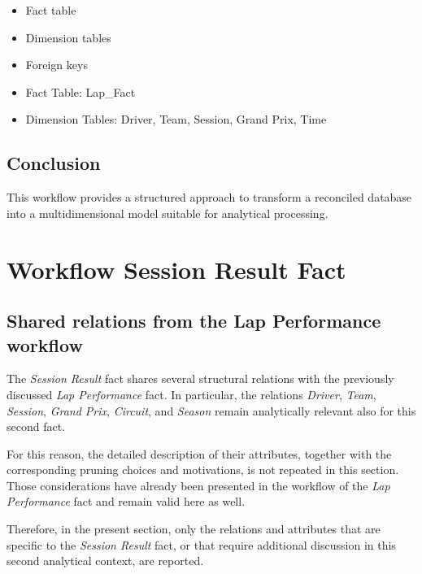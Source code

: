 \documentclass[a4paper,11pt]{article}
\begin{document}
	
	\begin{itemize}
		\item Fact table
		\item Dimension tables
		\item Foreign keys
	\end{itemize}
	
	
	\begin{itemize}
		\item Fact Table: Lap\_Fact
		\item Dimension Tables: Driver, Team, Session, Grand Prix, Time
	\end{itemize}
	
	\subsection{Conclusion}
	
	This workflow provides a structured approach to transform a reconciled database into a multidimensional model suitable for analytical processing.
	
	
	\section{Workflow Session Result Fact}
	
	\subsection{Shared relations from the Lap Performance workflow}
	
	The \textit{Session Result} fact shares several structural relations with the previously discussed \textit{Lap Performance} fact.
	In particular, the relations \textit{Driver}, \textit{Team}, \textit{Session}, \textit{Grand Prix}, \textit{Circuit}, and \textit{Season} remain analytically relevant also for this second fact.
	
	For this reason, the detailed description of their attributes, together with the corresponding pruning choices and motivations, is not repeated in this section.
	Those considerations have already been presented in the workflow of the \textit{Lap Performance} fact and remain valid here as well.
	
	Therefore, in the present section, only the relations and attributes that are specific to the \textit{Session Result} fact, or that require additional discussion in this second analytical context, are reported.
	
\end{document}
